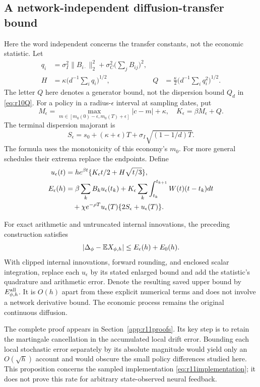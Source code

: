 \subsection{A network-independent diffusion-transfer bound}
Here the word independent concerns the transfer constants, not the economic statistic. Let
\begin{align*}
 q_i&=\sigma_I^2\|B_{i\cdot}\|_2^2+
                  \sigma_C^2\Big(\sum_jB_{ij}\Big)^2,\\
 H&=\kappa\Big(d^{-1}\sum_i q_i\Big)^{1/2},&
 Q&=\frac\kappa2\Big(d^{-1}\sum_i q_i^2\Big)^{1/2}.
\end{align*}
The letter $Q$ here denotes a generator bound, not the dispersion bound $Q_d$ in \eqref{eq:r10Q}. For a policy in a radius-$\epsilon$ interval at sampling dates, put
\[
 M_\epsilon=\max_{m\in[m_0(0)-\epsilon,m_0(T)+\epsilon]}|c-m|+\kappa,
 \quad K_\epsilon=\beta M_\epsilon+Q.
\]
The terminal dispersion majorant is
\[
 S_\epsilon=s_0+(\kappa+\epsilon)T+
                         \sigma_I\sqrt{(1-1/d)T}.
\]
The formula uses the monotonicity of this economy's $m_0$. For more general schedules their extrema replace the endpoints. Define
\begin{align}
 u_\epsilon(t)&=h e^{\beta t}
       \{K_\epsilon t/2+H\sqrt{t/3}\},\label{eq:r11strong}\\
 E_\epsilon(h)&=\beta\sum_k B_k u_\epsilon(t_k)
       +K_\epsilon\sum_k\int_{t_k}^{t_{k+1}}W(t)(t-t_k)dt\notag\\
 &\quad+\chi e^{-\rho T}u_\epsilon(T)
                             \{2S_\epsilon+u_\epsilon(T)\}.
 \label{eq:r11bias}
\end{align}

\begin{proposition}\label{prop:r11transfer}
For exact arithmetic and untruncated internal innovations, the preceding construction satisfies
\[
 |\Delta_\phi-\mathbb E X_{\phi,h}|
       \leq E_\epsilon(h)+E_0(h).
\]
With clipped internal innovations, forward rounding, and enclosed scalar integration, replace each $u_\epsilon$ by its stated enlarged bound and add the statistic's quadrature and arithmetic error. Denote the resulting saved upper bound by $E_{\phi,h}^{\rm all}$. It is $O(h)$ apart from these explicit numerical terms and does not involve a network derivative bound. The economic process remains the original continuous diffusion.
\end{proposition}

The complete proof appears in Section~\ref{app:r11proofs}. Its key step is to retain the martingale cancellation in the accumulated local drift error. Bounding each local stochastic error separately by its absolute magnitude would yield only an $O(\sqrt h)$ account and would obscure the small policy differences studied here. This proposition concerns the sampled implementation \eqref{eq:r11implementation}; it does not prove this rate for arbitrary state-observed neural feedback.

